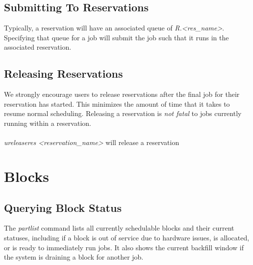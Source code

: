 \documentclass[12pt,letterpaper]{article}
\begin{document}
\subsection*{Submitting To Reservations}
Typically, a reservation will have an associated queue of \textit{R.\textless res\_name\textgreater}.  Specifying that queue for a job will submit the job such that it runs in the associated reservation.

\subsection*{Releasing Reservations}
We strongly encourage users to release reservations after the final job for their reservation has started.  This minimizes the amount of time that it takes to resume normal scheduling.  Releasing a reservation is \textit{not fatal} to jobs currently running within a reservation.  
\\
\\
\textit{ureleaseres \textless reservation\_name\textgreater} will release a reservation

\section*{Blocks}

\subsection*{Querying Block Status}

The \textit{partlist} command lists all currently schedulable blocks and their current statuses, including if a block is out of service due to hardware issues, is allocated, or is ready to immediately run jobs.  It also shows the current backfill window if the system is draining a block for another job.
\end{document}
